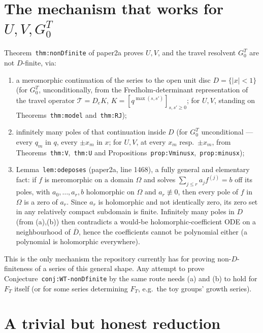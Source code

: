 \documentclass[11pt]{article}
\theoremstyle{remark}
\begin{document}
\section{The mechanism that works for $U,V,G^T_0$}\label{sec:mechanism}

Theorem~\texttt{thm:nonDfinite} of paper2a proves $U,V$, and the travel resolvent $G^T_0$ are not
$D$-finite, via:
\begin{enumerate}
\item[(a)] a meromorphic continuation of the series to the open unit disc $D=\{|x|<1\}$ (for $G^T_0$,
unconditionally, from the Fredholm-determinant representation of the travel operator
$\mathcal T=D_eK$, $K=[q^{\max(s,s')}]_{s,s'\ge0}$; for $U,V$, standing on Theorems~\texttt{thm:model}
and~\texttt{thm:RJ});
\item[(b)] infinitely many poles of that continuation inside $D$ (for $G^T_0$ unconditional — every
$q_m$ in $q$, every $\pm x_m$ in $x$; for $U,V$, at every $x_m$ resp.\ $\pm x_m$, from
Theorems~\texttt{thm:V},~\texttt{thm:U} and Propositions~\texttt{prop:Vminusx},~\texttt{prop:minusx});
\item[(c)] Lemma~\texttt{lem:odeposes} (paper2a, line 1468), a fully general and elementary fact: if $f$
is meromorphic on a domain $\Omega$ and solves $\sum_{j\le r}a_jf^{(j)}=b$ off its poles, with
$a_0,\dots,a_r,b$ holomorphic on $\Omega$ and $a_r\not\equiv0$, then every pole of $f$ in $\Omega$ is a
zero of $a_r$. Since $a_r$ is holomorphic and not identically zero, its zero set in any relatively
compact subdomain is finite. Infinitely many poles in $D$ (from (a),(b)) then contradicts a would-be
holomorphic-coefficient ODE on a neighbourhood of $\overline D$, hence the coefficients cannot be
polynomial either (a polynomial is holomorphic everywhere).
\end{enumerate}
This is the only mechanism the repository currently has for proving non-$D$-finiteness of a series of
this general shape. Any attempt to prove Conjecture~\texttt{conj:WT-nonDfinite} by the same route needs
(a) and (b) to hold for $F_T$ itself (or for some series determining $F_T$, e.g.\ the toy groups' growth
series).

\section{A trivial but honest reduction}\label{sec:reduction}
\end{document}
